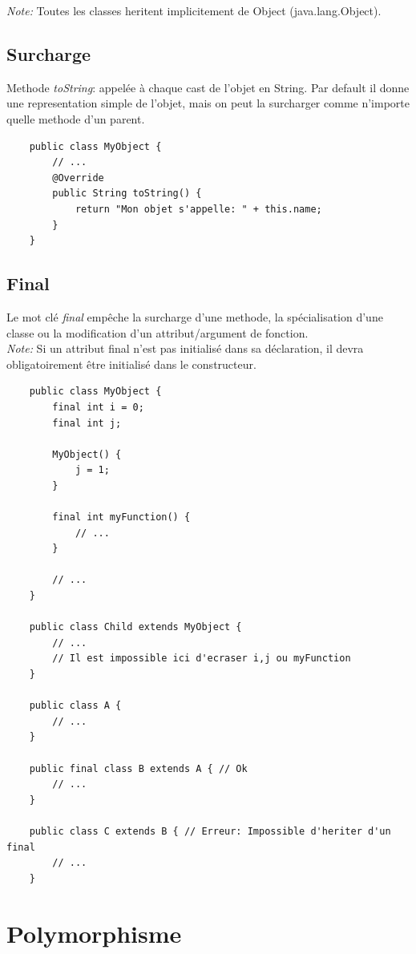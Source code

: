 \documentclass[a4paper, 12pt, french]{article}
\begin{document}
	\emph{Note:} Toutes les classes heritent implicitement de Object (java.lang.Object).\\

	\subsection{Surcharge}

	Methode \emph{toString}: appelée à chaque cast de l'objet en String. Par default il donne une representation simple de l'objet, mais on peut la surcharger comme n'importe quelle methode d'un parent.

	\begin{lstlisting}
	public class MyObject {
		// ...
		@Override
		public String toString() {
			return "Mon objet s'appelle: " + this.name;
		}
	}
	\end{lstlisting}

	\subsection{Final}

	Le mot clé \emph{final} empêche la surcharge d'une methode, la spécialisation d'une classe ou la modification d'un attribut/argument de fonction.\\

	\emph{Note:} Si un attribut final n'est pas initialisé dans sa déclaration, il devra obligatoirement être initialisé dans le constructeur.

	\begin{lstlisting}
	public class MyObject {
		final int i = 0;
		final int j;

		MyObject() {
			j = 1;
		}

		final int myFunction() {
			// ...
		}

		// ...
	}

	public class Child extends MyObject {
		// ...
		// Il est impossible ici d'ecraser i,j ou myFunction
	}

	public class A {
		// ...
	}

	public final class B extends A { // Ok
		// ...
	}

	public class C extends B { // Erreur: Impossible d'heriter d'un final
		// ...
	}
	\end{lstlisting}

	\section{Polymorphisme}
\end{document}
